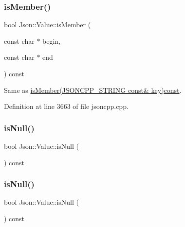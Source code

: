 \hypertarget{class_json_1_1_value_a2007e1e51f21f44ecf1f13e4a1c567b9}{}\label{class_json_1_1_value_a2007e1e51f21f44ecf1f13e4a1c567b9} 
\subsubsection{\texorpdfstring{is\+Member()}{isMember()}\hspace{0.1cm}{\footnotesize\ttfamily [6/6]}}
{\footnotesize\ttfamily bool Json\+::\+Value\+::is\+Member (\begin{DoxyParamCaption}\item[{const char $\ast$}]{begin,  }\item[{const char $\ast$}]{end }\end{DoxyParamCaption}) const}



Same as \hyperlink{class_json_1_1_value_a0c2cd838217b23ee6bde8135de1b30d9}{is\+Member(\+J\+S\+O\+N\+C\+P\+P\+\_\+\+S\+T\+R\+I\+N\+G const\& key)const}. 



Definition at line 3663 of file jsoncpp.\+cpp.

\hypertarget{class_json_1_1_value_abde4070e21e46dc4f8203f66582cb19f}{}\label{class_json_1_1_value_abde4070e21e46dc4f8203f66582cb19f} 
\subsubsection{\texorpdfstring{is\+Null()}{isNull()}\hspace{0.1cm}{\footnotesize\ttfamily [1/2]}}
{\footnotesize\ttfamily bool Json\+::\+Value\+::is\+Null (\begin{DoxyParamCaption}{ }\end{DoxyParamCaption}) const}

\hypertarget{class_json_1_1_value_abde4070e21e46dc4f8203f66582cb19f}{}\label{class_json_1_1_value_abde4070e21e46dc4f8203f66582cb19f} 
\subsubsection{\texorpdfstring{is\+Null()}{isNull()}\hspace{0.1cm}{\footnotesize\ttfamily [2/2]}}
{\footnotesize\ttfamily bool Json\+::\+Value\+::is\+Null (\begin{DoxyParamCaption}{ }\end{DoxyParamCaption}) const}



